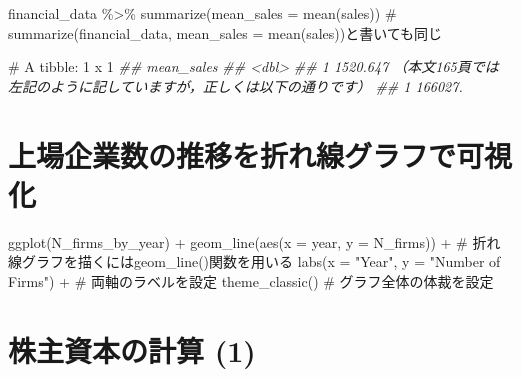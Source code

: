\documentclass[
  letterpaper,
  DIV=11,
  numbers=noendperiod]{scrreprt}
\newenvironment{Shaded}{\begin{snugshade}}{\end{snugshade}}
\newcommand{\AttributeTok}[1]{\textcolor[rgb]{0.40,0.45,0.13}{#1}}
\newcommand{\CommentTok}[1]{\textcolor[rgb]{0.37,0.37,0.37}{#1}}
\newcommand{\DocumentationTok}[1]{\textcolor[rgb]{0.37,0.37,0.37}{\textit{#1}}}
\newcommand{\FunctionTok}[1]{\textcolor[rgb]{0.28,0.35,0.67}{#1}}
\newcommand{\NormalTok}[1]{\textcolor[rgb]{0.00,0.23,0.31}{#1}}
\newcommand{\OtherTok}[1]{\textcolor[rgb]{0.00,0.23,0.31}{#1}}
\newcommand{\SpecialCharTok}[1]{\textcolor[rgb]{0.37,0.37,0.37}{#1}}
\newcommand{\StringTok}[1]{\textcolor[rgb]{0.13,0.47,0.30}{#1}}
\begin{document}
\begin{Shaded}
\begin{Highlighting}[]
\NormalTok{financial\_data }\SpecialCharTok{\%\textgreater{}\%} \FunctionTok{summarize}\NormalTok{(}\AttributeTok{mean\_sales =} \FunctionTok{mean}\NormalTok{(sales)) }\CommentTok{\# summarize(financial\_data, mean\_sales = mean(sales))と書いても同じ}

\CommentTok{\# A tibble: 1 x 1}
\DocumentationTok{\#\# mean\_sales}
\DocumentationTok{\#\# \textless{}dbl\textgreater{}}
\DocumentationTok{\#\#   1    1520.647 （本文165頁では左記のように記していますが，正しくは以下の通りです）}
\DocumentationTok{\#\#   1    166027.}
\end{Highlighting}
\end{Shaded}

\section{上場企業数の推移を折れ線グラフで可視化}\label{ux4e0aux5834ux4f01ux696dux6570ux306eux63a8ux79fbux3092ux6298ux308cux7ddaux30b0ux30e9ux30d5ux3067ux53efux8996ux5316}

\begin{Shaded}
\begin{Highlighting}[]
\FunctionTok{ggplot}\NormalTok{(N\_firms\_by\_year) }\SpecialCharTok{+} 
  \FunctionTok{geom\_line}\NormalTok{(}\FunctionTok{aes}\NormalTok{(}\AttributeTok{x =}\NormalTok{ year, }\AttributeTok{y =}\NormalTok{ N\_firms)) }\SpecialCharTok{+} \CommentTok{\# 折れ線グラフを描くにはgeom\_line()関数を用いる}
  \FunctionTok{labs}\NormalTok{(}\AttributeTok{x =} \StringTok{"Year"}\NormalTok{, }\AttributeTok{y =} \StringTok{"Number of Firms"}\NormalTok{) }\SpecialCharTok{+} \CommentTok{\# 両軸のラベルを設定}
  \FunctionTok{theme\_classic}\NormalTok{() }\CommentTok{\# グラフ全体の体裁を設定  }
\end{Highlighting}
\end{Shaded}

\section{株主資本の計算
(1)}\label{ux682aux4e3bux8cc7ux672cux306eux8a08ux7b97-1}

\begin{Shaded}
\end{Shaded}
\end{document}
